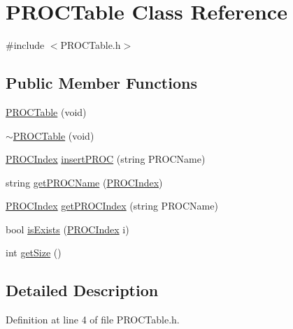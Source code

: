 \hypertarget{class_p_r_o_c_table}{\section{P\-R\-O\-C\-Table Class Reference}
\label{class_p_r_o_c_table}
}


{\ttfamily \#include $<$P\-R\-O\-C\-Table.\-h$>$}

\subsection*{Public Member Functions}
\begin{DoxyCompactItemize}
\item 
\hyperlink{class_p_r_o_c_table_ac5c90f5537fa8836aad4251a05fbdb6d}{P\-R\-O\-C\-Table} (void)
\item 
\hyperlink{class_p_r_o_c_table_a855c5ab75f14f93ebce7ef8eb954b982}{$\sim$\-P\-R\-O\-C\-Table} (void)
\item 
\hyperlink{_p_r_o_c_table_8h_a5440d93cde0c3651bf66bf75c77bf1b9}{P\-R\-O\-C\-Index} \hyperlink{class_p_r_o_c_table_ab9d9433d1944bed976173ea489d0cc16}{insert\-P\-R\-O\-C} (string P\-R\-O\-C\-Name)
\item 
string \hyperlink{class_p_r_o_c_table_a14ba41df2d1ded70867e7c4c047feb11}{get\-P\-R\-O\-C\-Name} (\hyperlink{_p_r_o_c_table_8h_a5440d93cde0c3651bf66bf75c77bf1b9}{P\-R\-O\-C\-Index})
\item 
\hyperlink{_p_r_o_c_table_8h_a5440d93cde0c3651bf66bf75c77bf1b9}{P\-R\-O\-C\-Index} \hyperlink{class_p_r_o_c_table_a9984496728a855e3d7815a6b518d4b5a}{get\-P\-R\-O\-C\-Index} (string P\-R\-O\-C\-Name)
\item 
bool \hyperlink{class_p_r_o_c_table_ac253ff3421050856f9f133d39bcb37ae}{is\-Exists} (\hyperlink{_p_r_o_c_table_8h_a5440d93cde0c3651bf66bf75c77bf1b9}{P\-R\-O\-C\-Index} i)
\item 
int \hyperlink{class_p_r_o_c_table_a3e3c64ee427bf7ae177f5222591b1ab0}{get\-Size} ()
\end{DoxyCompactItemize}


\subsection{Detailed Description}


Definition at line 4 of file P\-R\-O\-C\-Table.\-h.



